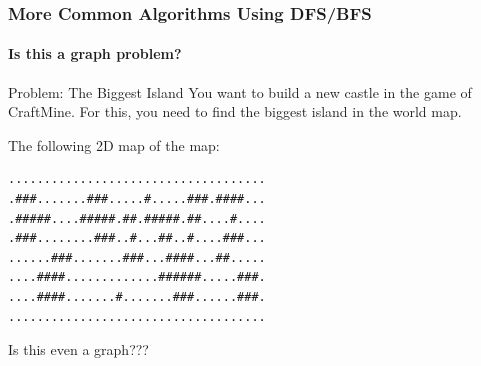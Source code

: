 \begin{frame}[fragile]
  \frametitle{More Common Algorithms Using DFS/BFS}
  \framesubtitle{Is this a graph problem?}

  \begin{block}{Problem: The Biggest Island}
    You want to build a new castle in the game of CraftMine. For this,
    you need to find the biggest island in the world map.

    \bigskip

     The following 2D map of the map:
\begin{verbatim}
....................................
.###.......###.....#.....###.####...
.#####....#####.##.#####.##....#....
.###........###..#...##..#....###...
......###.......###...####...##.....
....####.............######.....###.
....####.......#.......###......###.
....................................
\end{verbatim}
  \end{block}

  \bigskip

  Is this even a graph???
\end{frame}

